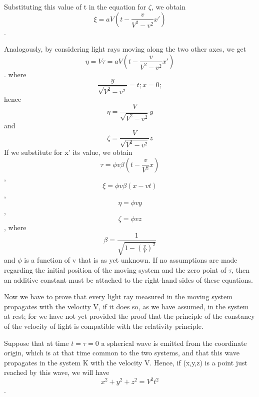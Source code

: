 ﻿\documentclass{article} %
\begin{document}
Substituting this value of t in the equation for $\zeta$, we obtain 
\begin{equation} \xi=aV\left(t-\frac{v}{V^2-v^2}x'\right) \nonumber\end{equation}.
 
Analogously, by considering light rays moving along the two other axes, we get 
\begin{equation} \eta=V\tau=aV\left(t-\frac{v}{V^2-v^2}x'\right) \nonumber\end{equation}.
where 
\begin{equation} \frac{y}{\sqrt{V^2-v^2}}=t;x=0; \nonumber\end{equation}
hence
\begin{equation} \eta=\frac{V}{\sqrt{V^2-v^2}}y \nonumber\end{equation}
and
\begin{equation} \zeta=\frac{V}{\sqrt{V^2-v^2}}z \nonumber\end{equation}
If we substitute for x' its value, we obtain
\begin{equation} \tau=\phi{v}\beta\left(t-\frac{v}{V^2}x\right) \nonumber\end{equation},
\begin{equation} \xi=\phi{v}\beta\left(x-vt\right) \nonumber\end{equation},
\begin{equation} \eta=\phi{v}y \nonumber\end{equation},
\begin{equation} \zeta=\phi{v}z \nonumber\end{equation},
where
\begin{equation} \beta=\frac{1}{\sqrt{1-\left(\frac{v}{V}\right)^2}} \nonumber\end{equation}
and $\phi$ is a function of v that is as yet unknown. 
If no assumptions are made regarding the initial position of the moving system and the zero point of $\tau$, then an additive constant must be attached to the right-hand sides of these equations. 

Now we have to prove that every light ray measured in the moving system propagates with the velocity V, if it does so, as we have assumed, in the system at rest; for we have not yet provided the proof that the principle of the constancy of the velocity of light is compatible with the relativity principle. 

Suppose that at time $t=\tau=0$ a spherical wave is emitted from the coordinate origin, which is at that time common to the two systems, and that this wave propagates in the system K with the velocity V. 
Hence, if (x,y,z) is a point just reached by this wave, we will have
\begin{equation} x^2+y^2+z^2=V^2t^2 \nonumber\end{equation}.
\end{document}
